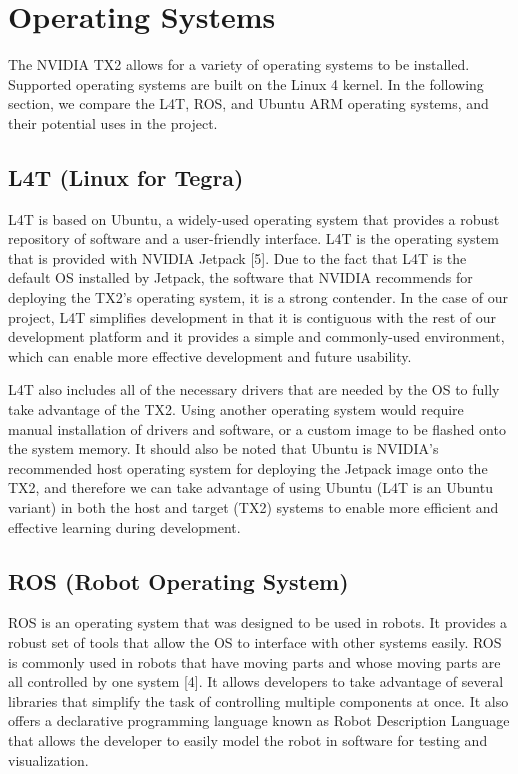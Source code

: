 \documentclass[letterpaper,10pt,serif,draftclsnofoot,onecolumn,compsoc,titlepage]{IEEEtran}
\begin{document}
\newpage
\section{Operating Systems}
The NVIDIA TX2 allows for a variety of operating systems to be installed. Supported operating systems are built on the Linux 4 kernel. In the following section, we compare the L4T, ROS, and Ubuntu ARM operating systems, and their potential uses in the project.

\subsection{L4T (Linux for Tegra)}
L4T is based on Ubuntu, a widely-used operating system that provides a robust repository of software and a user-friendly interface. L4T is the operating system that is provided with NVIDIA Jetpack [5]. Due to the fact that L4T is the default OS installed by Jetpack, the software that NVIDIA recommends for deploying the TX2's operating system, it is a strong contender. In the case of our project, L4T simplifies development in that it is contiguous with the rest of our development platform and it provides a simple and commonly-used environment, which can enable more effective development and future usability.

L4T also includes all of the necessary drivers that are needed by the OS to fully take advantage of the TX2. Using another operating system would require manual installation of drivers and software, or a custom image to be flashed onto the system memory. It should also be noted that Ubuntu is NVIDIA's recommended host operating system for deploying the Jetpack image onto the TX2, and therefore we can take advantage of using Ubuntu (L4T is an Ubuntu variant) in both the host and target (TX2) systems to enable more efficient and effective learning during development.

\subsection{ROS (Robot Operating System)}
ROS is an operating system that was designed to be used in robots. It provides a robust set of tools that allow the OS to interface with other systems easily. ROS is commonly used in robots that have moving parts and whose moving parts are all controlled by one system [4]. It allows developers to take advantage of several libraries that simplify the task of controlling multiple components at once. It also offers a declarative programming language known as Robot Description Language that allows the developer to easily model the robot in software for testing and visualization.
\end{document}
